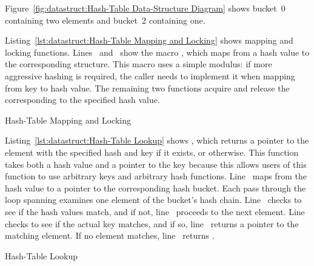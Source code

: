 Figure~\ref{fig:datastruct:Hash-Table Data-Structure Diagram}
shows bucket~0 containing two elements and bucket~2 containing one.

\begin{fcvref}
Listing~\ref{lst:datastruct:Hash-Table Mapping and Locking}
shows mapping and locking functions.
Lines~ and~
show the macro , which maps from a hash value
to the corresponding  structure.
This macro uses a simple modulus: if more aggressive hashing is required,
the caller needs to implement it when mapping from key to hash value.
The remaining two functions acquire and release the 
corresponding to the specified hash value.
\end{fcvref}

\begin{listing}[tb]

\caption{Hash-Table Mapping and Locking}
\label{lst:datastruct:Hash-Table Mapping and Locking}
\end{listing}

\begin{fcvref}
Listing~\ref{lst:datastruct:Hash-Table Lookup}
shows ,
which returns a pointer to the element with the specified hash and key if it
exists, or  otherwise.
This function takes both a hash value and a pointer to the key because
this allows users of this function to use arbitrary keys and
arbitrary hash functions.
Line~ maps from the hash value to a pointer to the corresponding
hash bucket.
Each pass through the loop spanning
 examines one element
of the bucket's hash chain.
Line~ checks to see if the hash values match, and if not,
line~
proceeds to the next element.
Line~ checks to see if the actual key matches, and if so,
line~ returns a pointer to the matching element.
If no element matches, line~ returns .
\end{fcvref}

\begin{listing}[tb]

\caption{Hash-Table Lookup}
\label{lst:datastruct:Hash-Table Lookup}
\end{listing}

\QuickQuizEnd


